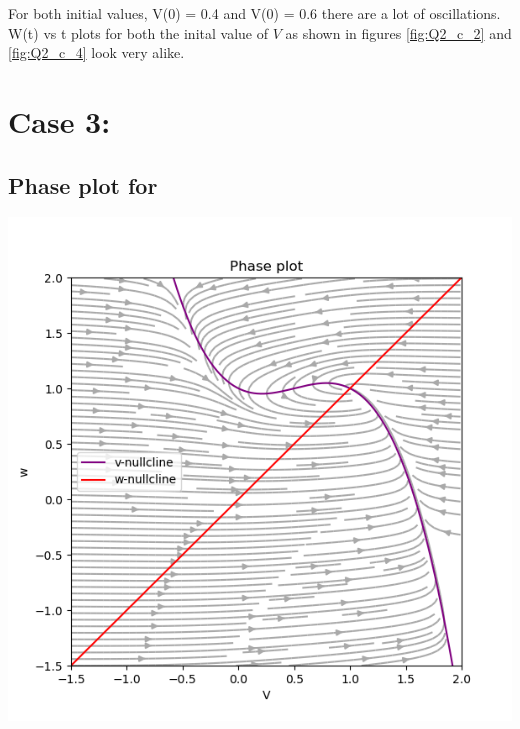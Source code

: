 \documentclass[a4paper, 12pt]{article}
\begin{document}
\vspace{2em}
\noindent
For both initial values, V(0) = 0.4 and V(0) = 0.6 there are a lot of oscillations. W(t) vs t plots for both the inital value of $ V $ as shown in figures \ref{fig:Q2_c_2} and \ref{fig:Q2_c_4} look very alike.

\section{Case 3: }
\label{case_3}

\subsection{Phase plot for }

\begin{minipage}{0.48\linewidth}
    \centering
    \includegraphics[width=\textwidth]{Q3_a}
    \label{fig:Q3_a}
\end{minipage}
\hfill
\end{document}
